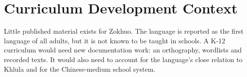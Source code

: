 \documentclass[12pt]{article}
\begin{document}
\section{Curriculum Development Context}
Little published material exists for Zokhuo. The language is reported as the first language of all adults, but it is not known to be taught in schools. A K-12 curriculum would need new documentation work: an orthography, wordlists and recorded texts. It would also need to account for the language's close relation to Khlula and for the Chinese-medium school system.
\end{document}
